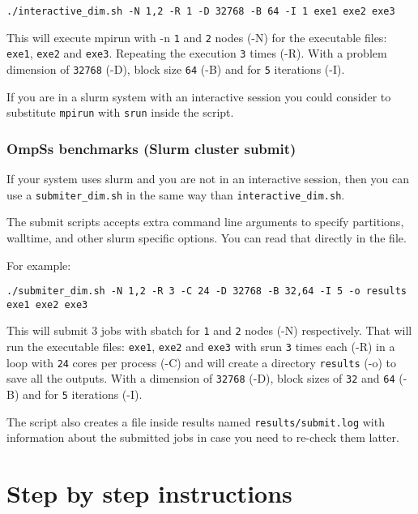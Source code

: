 \documentclass{article}
\newcommand{\code}[1]{\texttt{#1}}
\begin{document}
\begin{lstlisting}
./interactive_dim.sh -N 1,2 -R 1 -D 32768 -B 64 -I 1 exe1 exe2 exe3
\end{lstlisting}

This will execute mpirun with -n \code{1} and \code{2} nodes (-N) for
the executable files: \code{exe1}, \code{exe2} and
\code{exe3}. Repeating the execution \code{3} times (-R). With a
problem dimension of \code{32768} (-D), block size \code{64} (-B) and
for \code{5} iterations (-I).

If you are in a slurm system with an interactive session you could
consider to substitute \code{mpirun} with \code{srun} inside the
script.

\subsubsection{OmpSs benchmarks (Slurm cluster submit)}

If your system uses slurm and you are not in an interactive session,
then you can use a \code{submiter\_dim.sh} in the same way than
\code{interactive\_dim.sh}. 

The submit scripts accepts extra command line arguments to specify
partitions, walltime, and other slurm specific options. You can read
that directly in the file.

For example:

\begin{lstlisting}
./submiter_dim.sh -N 1,2 -R 3 -C 24 -D 32768 -B 32,64 -I 5 -o results exe1 exe2 exe3
\end{lstlisting}

This will submit 3 jobs with sbatch for \code{1} and \code{2} nodes
(-N) respectively. That will run the executable files: \code{exe1},
\code{exe2} and \code{exe3} with srun \code{3} times each (-R) in a
loop with \code{24} cores per process (-C) and will create a directory
\code{results} (-o) to save all the outputs. With a dimension of
\code{32768} (-D), block sizes of \code{32} and \code{64} (-B) and for
\code{5} iterations (-I).

The script also creates a file inside results named
\code{results/submit.log} with information about the submitted jobs in
case you need to re-check them latter.

\section{Step by step instructions}
\end{document}
